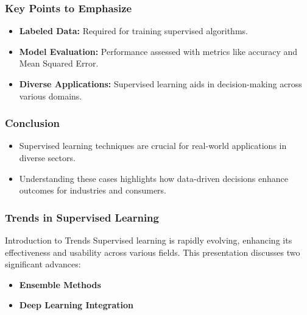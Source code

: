 \documentclass[aspectratio=169]{beamer}
\begin{document}
\begin{frame}[fragile]
    \frametitle{Key Points to Emphasize}
    \begin{itemize}
        \item \textbf{Labeled Data:} Required for training supervised algorithms.
        \item \textbf{Model Evaluation:} Performance assessed with metrics like accuracy and Mean Squared Error.
        \item \textbf{Diverse Applications:} Supervised learning aids in decision-making across various domains.
    \end{itemize}
\end{frame}

\begin{frame}[fragile]
    \frametitle{Conclusion}
    \begin{itemize}
        \item Supervised learning techniques are crucial for real-world applications in diverse sectors.
        \item Understanding these cases highlights how data-driven decisions enhance outcomes for industries and consumers.
    \end{itemize}
\end{frame}

\begin{frame}
    \frametitle{Trends in Supervised Learning}
    \begin{block}{Introduction to Trends}
        Supervised learning is rapidly evolving, enhancing its effectiveness and usability across various fields.
        This presentation discusses two significant advances: 
        \begin{itemize}
            \item \textbf{Ensemble Methods}
            \item \textbf{Deep Learning Integration}
        \end{itemize}
    \end{block}
\end{frame}
\end{document}

